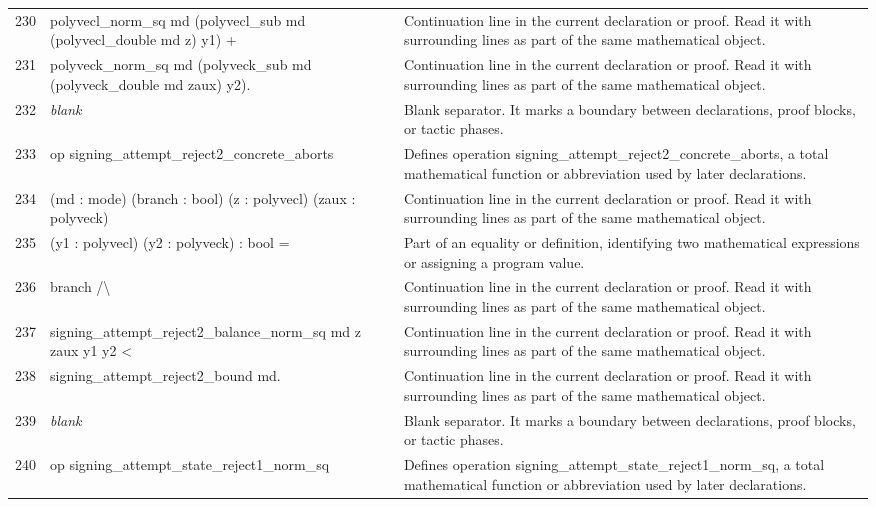 \documentclass[10pt]{article}
\begin{document}
\begin{longtable}{r L{0.53\textwidth} L{0.37\textwidth}}
230 & {\ttfamily\scriptsize   polyvecl\_norm\_sq md (polyvecl\_sub md (polyvecl\_double md z) y1) +} & Continuation line in the current declaration or proof.  Read it with surrounding lines as part of the same mathematical object. \\
231 & {\ttfamily\scriptsize   polyveck\_norm\_sq md (polyveck\_sub md (polyveck\_double md zaux) y2).} & Continuation line in the current declaration or proof.  Read it with surrounding lines as part of the same mathematical object. \\
232 & {\ttfamily\scriptsize \emph{blank}} & Blank separator.  It marks a boundary between declarations, proof blocks, or tactic phases. \\
233 & {\ttfamily\scriptsize op signing\_attempt\_reject2\_concrete\_aborts} & Defines operation signing\_attempt\_reject2\_concrete\_aborts, a total mathematical function or abbreviation used by later declarations. \\
234 & {\ttfamily\scriptsize    (md : mode) (branch : bool) (z : polyvecl) (zaux : polyveck)} & Continuation line in the current declaration or proof.  Read it with surrounding lines as part of the same mathematical object. \\
235 & {\ttfamily\scriptsize    (y1 : polyvecl) (y2 : polyveck) : bool =} & Part of an equality or definition, identifying two mathematical expressions or assigning a program value. \\
236 & {\ttfamily\scriptsize   branch /\textbackslash{}} & Continuation line in the current declaration or proof.  Read it with surrounding lines as part of the same mathematical object. \\
237 & {\ttfamily\scriptsize   signing\_attempt\_reject2\_balance\_norm\_sq md z zaux y1 y2 <} & Continuation line in the current declaration or proof.  Read it with surrounding lines as part of the same mathematical object. \\
238 & {\ttfamily\scriptsize   signing\_attempt\_reject2\_bound md.} & Continuation line in the current declaration or proof.  Read it with surrounding lines as part of the same mathematical object. \\
239 & {\ttfamily\scriptsize \emph{blank}} & Blank separator.  It marks a boundary between declarations, proof blocks, or tactic phases. \\
240 & {\ttfamily\scriptsize op signing\_attempt\_state\_reject1\_norm\_sq} & Defines operation signing\_attempt\_state\_reject1\_norm\_sq, a total mathematical function or abbreviation used by later declarations. \\

\end{longtable}
\end{document}
